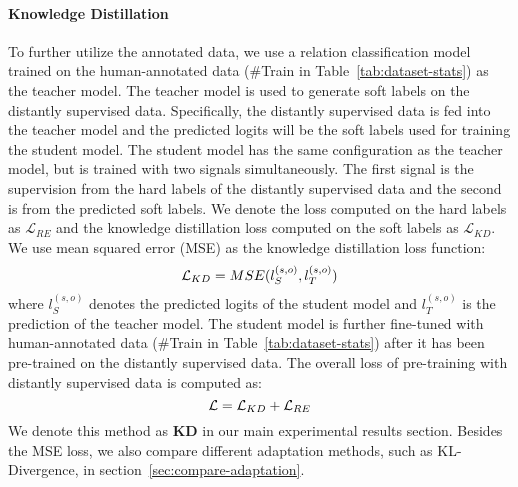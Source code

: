 \documentclass[11pt]{article}
\begin{document}
    \paragraph{Knowledge Distillation} To further utilize the annotated data, we use a relation classification model trained on the human-annotated data (\#Train in Table~\ref{tab:dataset-stats}) as the teacher model. The teacher model is used to generate soft labels on the distantly supervised data. Specifically, the distantly supervised data is fed into the teacher model and the predicted logits will be the soft labels used for training the student model. The student model has the same configuration as the teacher model, but is trained with two signals simultaneously. The first signal is the supervision from the hard labels of the distantly supervised data and the second is from the predicted soft labels. We denote the loss computed on the hard labels as $\mathcal{L}_{RE}$ and the knowledge distillation loss computed on the soft labels as $\mathcal{L}_{KD}$. We use mean squared error (MSE) as the knowledge distillation loss function:
    \begin{equation}
    \abovedisplayskip=2pt
    \belowdisplayskip=2pt
        \mathcal{L}_{KD} = MSE({l}^{(s,o)}_{S} ,{l}^{(s,o)}_{T})
    \end{equation}
    where ${l}^{(s,o)}_{S}$ denotes the predicted logits of the student model and ${l}^{(s,o)}_{T}$ is the prediction of the teacher model.
The student model is further fine-tuned with human-annotated data (\#Train in Table~\ref{tab:dataset-stats}) after it has been pre-trained on the distantly supervised data. 
    The overall loss of pre-training with distantly supervised data is computed as:
    \begin{equation}
    \abovedisplayskip=2pt
    \belowdisplayskip=2pt
        \mathcal{L} =  \mathcal{L}_{KD} + \mathcal{L}_{RE}
    \end{equation}
    We denote this method as \textbf{KD} in our main experimental results section. Besides the MSE loss, we also compare different adaptation methods, such as KL-Divergence, in section~\ref{sec:compare-adaptation}.



    
\end{document}
